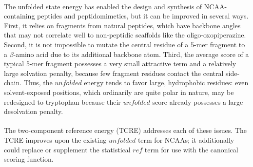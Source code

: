 \paragraph{}
The unfolded state energy has enabled the design and synthesis of NCAA-containing peptides and peptidomimetics\cite{lao_rational_2014,drew_adding_2013}, but it can be improved in several ways.
First, it relies on fragments from natural peptides, which have backbone angles that may not correlate well to non-peptidic scaffolds like the oligo-oxopiperazine.
Second, it is not impossible to mutate the central residue of a 5-mer fragment to a $\beta$-amino acid due to its additional backbone atom.
Third, the average score of a typical 5-mer fragment possesses a very small attractive term and a relatively large solvation penalty, because few fragment residues contact the central side-chain. 
Thus, the $unfolded$ energy tends to favor large, hydrophobic residues: even solvent-exposed positions, which ordinarily are quite polar in nature, may be redesigned to tryptophan because their $unfolded$ score already possesses a large desolvation penalty.

\paragraph{}
The two-component reference energy (TCRE) addresses each of these issues.
The TCRE improves upon the existing $unfolded$ term for NCAAs; it additionally could replace or supplement the statistical $ref$ term for use with the canonical scoring function.



